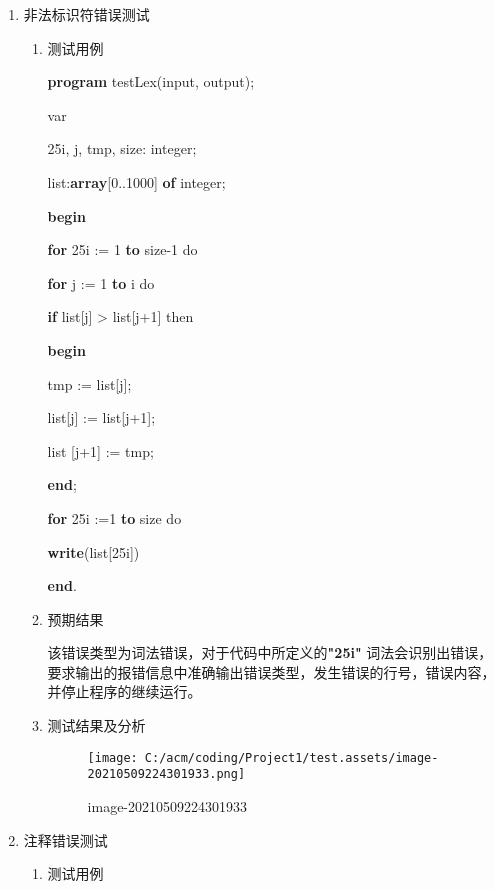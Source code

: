 \documentclass[]{ctexart}
\newenvironment{Shaded}{}{}
\newcommand{\DataTypeTok}[1]{\textcolor[rgb]{0.56,0.13,0.00}{#1}}
\newcommand{\DecValTok}[1]{\textcolor[rgb]{0.25,0.63,0.44}{#1}}
\newcommand{\KeywordTok}[1]{\textcolor[rgb]{0.00,0.44,0.13}{\textbf{#1}}}
\newcommand{\NormalTok}[1]{#1}
\begin{document}
\begin{enumerate}
\def\labelenumi{\arabic{enumi}.}
\item
  非法标识符错误测试

  \begin{enumerate}
  \def\labelenumii{\arabic{enumii}.}
  \item
    测试用例

\begin{Shaded}
\begin{Highlighting}[]
\KeywordTok{program}\NormalTok{ testLex(input, output);
}
\NormalTok{var
}
\NormalTok{	25i, j, tmp, size: }\DataTypeTok{integer}\NormalTok{;
}
\NormalTok{	list:}\KeywordTok{array}\NormalTok{[}\DecValTok{0}\NormalTok{..}\DecValTok{1000}\NormalTok{] }\KeywordTok{of} \DataTypeTok{integer}\NormalTok{;
}
\KeywordTok{begin}

    \KeywordTok{for}\NormalTok{ 25i := }\DecValTok{1} \KeywordTok{to}\NormalTok{ size}\DecValTok{-1}\NormalTok{ do
}
	\KeywordTok{for}\NormalTok{ j := }\DecValTok{1} \KeywordTok{to}\NormalTok{ i do
}
	    \KeywordTok{if}\NormalTok{ list[j] > list[j+}\DecValTok{1}\NormalTok{] then
}
	    \KeywordTok{begin}

\NormalTok{		    tmp := list[j];
}
\NormalTok{		    list[j] := list[j+}\DecValTok{1}\NormalTok{];
}
\NormalTok{		    list [j+}\DecValTok{1}\NormalTok{] := tmp;
}
	    \KeywordTok{end}\NormalTok{;
}


    \KeywordTok{for}\NormalTok{ 25i :=}\DecValTok{1} \KeywordTok{to}\NormalTok{ size do
}
	\KeywordTok{write}\NormalTok{(list[25i])
}
\KeywordTok{end}\NormalTok{.}
\end{Highlighting}
\end{Shaded}
  \item
    预期结果

    该错误类型为词法错误，对于代码中所定义的\textbf{"25i"}
    词法会识别出错误，要求输出的报错信息中准确输出错误类型，发生错误的行号，错误内容，并停止程序的继续运行。
  \item
    测试结果及分析

    \begin{figure}
    \centering
    \texttt{[image: C:/acm/coding/Project1/test.assets/image-20210509224301933.png]}
    \caption{image-20210509224301933}
    \end{figure}
  \end{enumerate}
\item
  注释错误测试

  \begin{enumerate}
  \def\labelenumii{\arabic{enumii}.}
  \item
    测试用例


\end{enumerate}
\end{enumerate}
\end{document}

